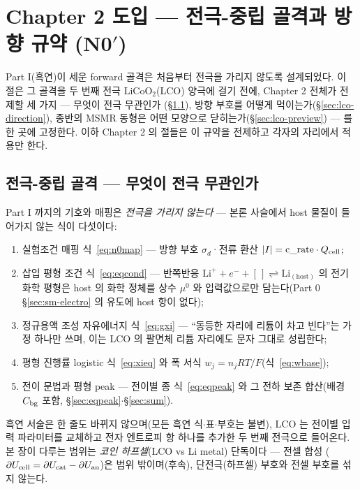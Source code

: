 \section{Chapter 2 도입 --- 전극-중립 골격과 방향 규약 (N0$'$)}\label{sec:lco-intro}
Part I(흑연)이 세운 forward 골격은 처음부터 전극을 가리지 않도록 설계되었다. 이 절은 그 골격을 두 번째 전극
$\mathrm{LiCoO_2}$(LCO) 양극에 걸기 전에, Chapter 2 전체가 전제할 세 가지 --- 무엇이 전극 무관인가
(\S\ref{sec:lco-map}), 방향 부호를 어떻게 먹이는가(\S\ref{sec:lco-direction}), 종반의 MSMR 동형은 어떤
모양으로 닫히는가(\S\ref{sec:lco-preview}) --- 를 한 곳에 고정한다. 이하 Chapter 2 의 절들은 이 규약을
전제하고 각자의 자리에서 적용만 한다.

\subsection{전극-중립 골격 --- 무엇이 전극 무관인가}\label{sec:lco-map}
Part I 까지의 기호와 매핑은 \emph{전극을 가리지 않는다} --- 본론 사슬에서 host 물질이 들어가지 않는 식이
다섯이다:
\begin{enumerate}[label=(\arabic*),leftmargin=2.2em,itemsep=1pt]
\item 실험조건 매핑 식~\eqref{eq:n0map} --- 방향 부호 $\sigma_d$·전류 환산 $|I|=\text{c\_rate}\cdot Q_{\mathrm{cell}}$;
\item 삽입 평형 조건 식~\eqref{eq:eqcond} --- 반쪽반응
$\mathrm{Li}^++e^-+[\,]\rightleftharpoons\mathrm{Li}_{(\mathrm{host})}$ 의 전기화학 평형은 host 의 화학
정체를 상수 $\mu^0$ 와 입력값으로만 담는다(Part 0 \S\ref{sec:sm-electro} 의 유도에 host 항이 없다);
\item 정규용액 조성 자유에너지 식~\eqref{eq:gxi} --- ``동등한 자리에 리튬이 차고 빈다''는 가정 하나만 쓰며,
이는 LCO 의 팔면체 리튬 자리에도 문자 그대로 성립한다;
\item 평형 진행률 logistic 식~\eqref{eq:xieq} 와 폭 서식 $w_j=n_jRT/F$(식~\eqref{eq:wbase});
\item 전이 문법과 평형 peak --- 전이별 종 식~\eqref{eq:eqpeak} 와 그 전하 보존 합산(배경 $C_{\mathrm{bg}}$ 포함,
\S\ref{sec:eqpeak}$\cdot$\S\ref{sec:sum}).
\end{enumerate}
흑연 서술은 한 줄도 바뀌지 않으며(모든 흑연
식$\cdot$표$\cdot$부호는 불변), LCO 는 전이별 입력 파라미터를 교체하고 전자 엔트로피 항 하나를 추가한
두 번째 전극으로 들어온다. 본 장이 다루는 범위는 \emph{코인 하프셀}(LCO vs Li metal) 단독이다 --- 전셀 합성
($\partial U_{\mathrm{cell}}=\partial U_\mathrm{cat}-\partial U_\mathrm{an}$)은 범위 밖이며(후속), 단전극(하프셀) 부호와 전셀
부호를 섞지 않는다.

